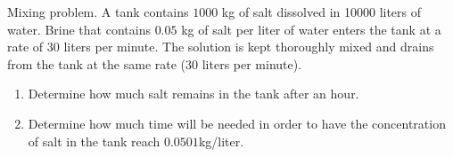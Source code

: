 Mixing problem. A tank contains $1000$ kg of salt dissolved in 10000 liters of water. Brine that contains $0.05$ kg of salt per liter of water enters the tank at a rate of $30$ liters per minute. The solution is kept thoroughly mixed and drains from the tank at the same rate ($30$ liters per minute). 
\begin{enumerate}
\item Determine how much salt remains in the tank after an hour.
\item Determine how much time will be needed in order to have the concentration of salt in the tank reach $0.0501$kg/liter.
\end{enumerate}
